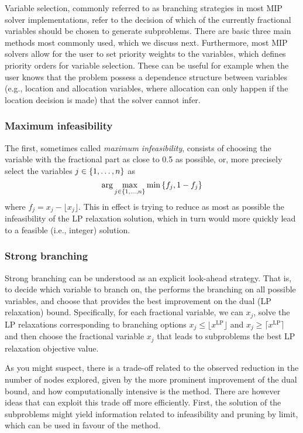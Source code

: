 Variable selection, commonly referred to as branching strategies in most MIP solver implementations, refer to the decision of which of the currently fractional variables should be chosen to generate subproblems. There are basic three main methods most commonly used, which we discuss next. Furthermore, most MIP solvers allow for the user to set priority weights  to the variables, which defines priority orders for variable selection. These can be useful for example when the user knows that the problem possess a dependence structure between variables (e.g., location and allocation variables, where allocation can only happen if the location decision is made) that the solver cannot infer. 


\subsubsection{Maximum infeasibility}

The first, sometimes called \emph{maximum infeasibility}, consists of choosing the variable with the fractional part as close to 0.5 as possible, or, more precisely select the variables $j \in \left\{ 1, \dots, n \right \}$ as
%
\begin{equation*}
	\arg\max_{j \in \left\{ 1,\dots,n \right \}} \min\left\{ f_j, 1 - f_j \right \} 	
\end{equation*}
%
where $f_j = x_j - \lfloor x_j \rfloor$. This in effect is trying to reduce as most as possible the infeasibility of the LP relaxation solution, which in turn would more quickly lead to a feasible (i.e., integer) solution.

\subsubsection{Strong branching}

Strong branching can be understood as an explicit look-ahead strategy. That is, to decide which variable to branch on, the performs the branching on all possible variables, and choose that provides the best improvement on the dual (LP relaxation) bound. Specifically, for each fractional variable, we can $x_j$, solve the LP relaxations corresponding to branching options $x_j \leq \lfloor x^\text{LP} \rfloor$ and $x_j \geq \lceil x^\text{LP} \rceil$ and then choose the fractional variable $x_j$ that leads to subproblems the best LP relaxation objective value.

As you might suspect, there is a trade-off related to the observed reduction in the number of nodes explored, given by the more prominent improvement of the dual bound, and how computationally intensive is the method. There are however ideas that can exploit this trade off more efficiently. First, the solution of the subproblems might yield  information related to infeasibility and pruning by limit, which can be used in favour of the method. 

